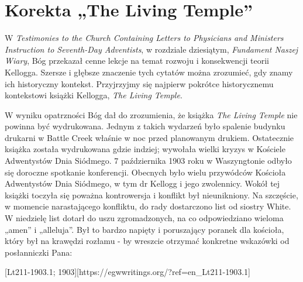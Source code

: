 \chapter{Korekta „The Living Temple”}

W \textit{Testimonies to the Church Containing Letters to Physicians and Ministers Instruction to Seventh-Day Adventists}, w rozdziale dziesiątym, \textit{Fundament Naszej Wiary}, Bóg przekazał cenne lekcje na temat rozwoju i konsekwencji teorii Kellogga. Szersze i głębsze znaczenie tych cytatów można zrozumieć, gdy znamy ich historyczny kontekst. Przyjrzyjmy się najpierw pokrótce historycznemu kontekstowi książki Kellogga, \textit{The Living Temple}.

W wyniku opatrzności Bóg dał do zrozumienia, że książka \textit{The Living Temple} nie powinna być wydrukowana. Jednym z takich wydarzeń było spalenie budynku drukarni w Battle Creek właśnie w noc przed planowanym drukiem. Ostatecznie książka została wydrukowana gdzie indziej; wywołała wielki kryzys w Kościele Adwentystów Dnia Siódmego. 7 października 1903 roku w Waszyngtonie odbyło się doroczne spotkanie konferencji. Obecnych było wielu przywódców Kościoła Adwentystów Dnia Siódmego, w tym dr Kellogg i jego zwolennicy. Wokół tej książki toczyła się poważna kontrowersja i konflikt był nieunikniony. Na szczęście, w momencie narastającego konfliktu, do rady dostarczono list od siostry White. W niedzielę list dotarł do uszu zgromadzonych, na co odpowiedziano wieloma „amen” i „alleluja”. Był to bardzo napięty i poruszający poranek dla kościoła, który był na krawędzi rozłamu - by wreszcie otrzymać konkretne wskazówki od posłanniczki Pana:

[Lt211-1903.1; 1903][https://egwwritings.org/?ref=en\_Lt211-1903.1]

